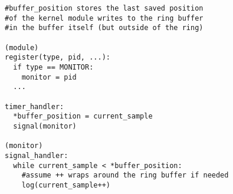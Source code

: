 \documentclass{article}
\begin{document}
\begin{verbatim}
#buffer_position stores the last saved position 
#of the kernel module writes to the ring buffer
#in the buffer itself (but outside of the ring)

(module)
register(type, pid, ...):
  if type == MONITOR:
    monitor = pid
  ...
  
timer_handler:
  *buffer_position = current_sample
  signal(monitor)
  
(monitor)
signal_handler:
  while current_sample < *buffer_position:
    #assume ++ wraps around the ring buffer if needed
    log(current_sample++)
\end{verbatim}
\end{document}
